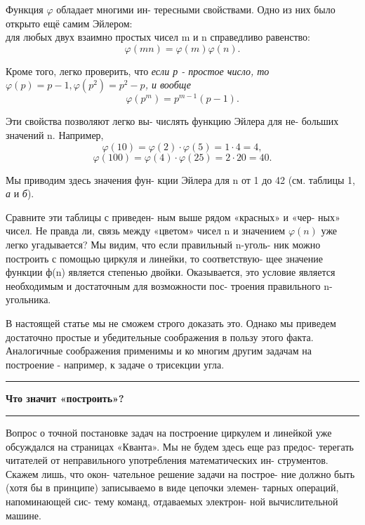 \begin{multicols}{3}
Функция $\varphi$ обладает многими ин-
тересными свойствами.  Одно из них
было открыто ещё самим Эйлером: \\
для любых двух взаимно простых
чисел m и n справедливо равенство: \\
\begin{equation}
\varphi(mn) = \varphi(m)\varphi(n).
\end{equation}

Кроме того, легко проверить, что
\textit{если р - простое ҹисло,  то \\
$\varphi(p) = p - 1,  \varphi(p^2) = p^2 - p$,  и вообще}
\begin{equation}
\varphi(p^m) = p^{m - 1}(p - 1).
\end{equation}

Эти свойства позволяют легко вы-
числять функцию Эйлера для не-
больших значений n.  Например,
$$\varphi(10) = \varphi(2)\cdot\varphi(5) = 1\cdot4 = 4,$$
\columnbreak
$$\varphi(100) = \varphi(4)\cdot\varphi(25) = 2\cdot20 = 40.$$

Мы приводим здесь значения фун-
кции Эйлера для n от 1 до 42 (см.
таблицы 1,  \textit{а} и \textit{б}).

Сравните эти таблицы с приведен-
ным выше рядом «красных» и «чер-
ных» чисел.  Не правда ли, связь
между «цветом» чисел n и значением
$\varphi(n)$ уже легко угадывается? Мы
видим, что если правильный n-уголь-
ник можно построить с помощью
циркуля и линейки,  то соответствую-
щее значение функции ф(n) является
степенью двойки.  Оказывается, это
условие является необходимым и
достаточным для возможности пос-
троения правильного n-угольника.

В настоящей статье мы не сможем
строго доказать это.  Однако мы приведем достаточно простые и 
убедительные соображения в пользу этого
факта.  Аналогичные соображения
применимы и ко многим другим задачам на построение - например,  к
задаче о трисекции угла.
\noindent\rule{0.33\textwidth}{0.4pt}
\textbf{\large{Что значит «построить»?}}

\noindent\rule{0.33\textwidth}{0.4pt}
Вопрос о точной постановке задач на
построение циркулем и линейкой уже
обсуждался на страницах «Кванта».
Мы не будем здесь еще раз предос-
терегать читателей от неправильного
употребления математических ин-
струментов.  Скажем лишь, что окон-
чательное решение задачи на построе-
ние должно быть (хотя бы в принципе)
записываемо в виде цепочки элемен-
тарных операций, напоминающей сис-
тему команд,  отдаваемых электрон-
ной вычислительной машине.

\end{multicols}
\vspace*{-\baselineskip}
\vspace{1mm}

